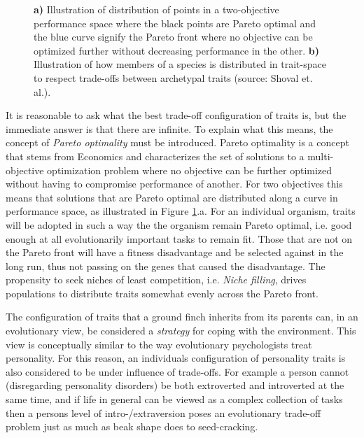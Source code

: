 \begin{figure}[ht]
\begin{minipage}[l]{0.4\textwidth}
	\end{minipage}
	\caption{\label{fig:trade_offs_finch_paretoOptimality} \textbf{a)} Illustration of distribution of points in a two-objective performance space where the black points are Pareto optimal and the blue curve signify the Pareto front where no objective can be optimized further without decreasing performance in the other. \textbf{b)} Illustration of how members of a species is distributed in trait-space to respect trade-offs between archetypal traits (source: Shoval et. al.\cite{shoval2012evolutionary}).}
\end{figure}

It is reasonable to ask what the best trade-off configuration of traits is, but the immediate answer is that there are infinite. To explain what this means, the concept of \textit{Pareto optimality} must be introduced. Pareto optimality is a concept that stems from Economics and characterizes the set of solutions to a multi-objective optimization problem where no objective can be further optimized without having to compromise performance of another. For two objectives this means that solutions that are Pareto optimal are distributed along a curve in performance space, as illustrated in Figure \ref{fig:trade_offs_finch_paretoOptimality}.a. For an individual organism, traits will be adopted in such a way the the organism remain Pareto optimal, i.e. good enough at all evolutionarily important tasks to remain fit. Those that are not on the Pareto front will have a fitness disadvantage and be selected against in the long run, thus not passing on the genes that caused the disadvantage. The propensity to seek niches of least competition, i.e. \textit{Niche filling}, drives populations to distribute traits somewhat evenly across the Pareto front.

The configuration of traits that a ground finch inherits from its parents can, in an evolutionary view, be considered a \textit{strategy} for coping with the environment. This view is conceptually similar to the way evolutionary psychologists treat personality. For this reason, an individuals configuration of personality traits is also considered to be under influence of trade-offs. For example a person cannot (disregarding personality disorders) be both extroverted and introverted at the same time, and if life in general can be viewed as a complex collection of tasks then a persons level of intro-/extraversion poses an evolutionary trade-off problem just as much as beak shape does to seed-cracking.


